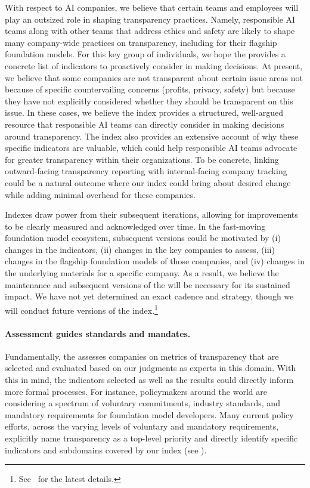 \documentclass[screen, authorversion, acmsmall]{acmart}
\begin{document}
With respect to AI companies, we believe that certain teams and employees will play an outsized role in shaping transparency practices.
Namely, responsible AI teams along with other teams that address ethics and safety are likely to shape many company-wide practices on transparency, including for their flagship foundation models.
For this key group of individuals, we hope the \projectname provides a concrete list of indicators to proactively consider in making decisions.
At present, we believe that some companies are not transparent about certain issue areas not because of specific countervailing concerns (\eg profits, privacy, safety) but because they have not explicitly considered whether they should be transparent on this issue. 
In these cases, we believe the index provides a structured, well-argued resource that responsible AI teams can directly consider in making decisions around transparency.
The index also provides an extensive account of why these specific indicators are valuable, which could help responsible AI teams advocate for greater transparency within their organizations.
To be concrete, linking outward-facing transparency reporting with internal-facing company tracking could be a natural outcome where our index could bring about desired change while adding minimal overhead for these companies.

Indexes draw power from their subsequent iterations, allowing for improvements to be clearly measured and acknowledged over time.
In the fast-moving foundation model ecosystem, subsequent versions could be motivated by (i) changes in the indicators, (ii) changes in the key companies to assess, (iii) changes in the flagship foundation models of those companies, and (iv) changes in the underlying materials for a specific company. 
As a result, we believe the maintenance and subsequent versions of the \projectname will be necessary for its sustained impact.
We have not yet determined an exact cadence and strategy, though we will conduct future versions of the index.\footnote{See \indexUrl~for the latest details.} 

\paragraph{Assessment guides standards and mandates.}
Fundamentally, the \projectname assesses companies on metrics of transparency that are selected and evaluated based on our judgments as experts in this domain.
With this in mind, the indicators selected as well as the results could directly inform more formal processes.
For instance, policymakers around the world are considering a spectrum of voluntary commitments, industry standards, and mandatory requirements for foundation model developers.
Many current policy efforts, across the varying levels of voluntary and mandatory requirements, explicitly name transparency as a top-level priority and directly identify specific indicators and subdomains covered by our index (see ).
\end{document}

